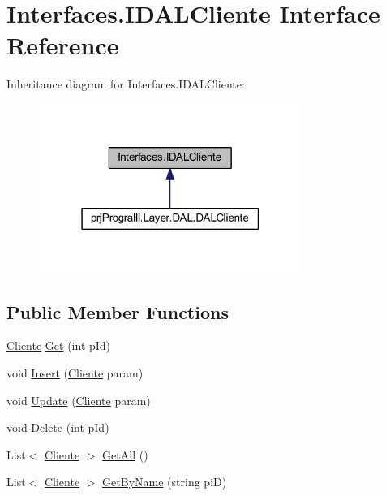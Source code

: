 \hypertarget{interface_interfaces_1_1_i_d_a_l_cliente}{}\section{Interfaces.\+I\+D\+A\+L\+Cliente Interface Reference}
\label{interface_interfaces_1_1_i_d_a_l_cliente}


Inheritance diagram for Interfaces.\+I\+D\+A\+L\+Cliente\+:
\nopagebreak
\begin{figure}[H]
\begin{center}
\leavevmode
\includegraphics[width=243pt]{interface_interfaces_1_1_i_d_a_l_cliente__inherit__graph}
\end{center}
\end{figure}
\subsection*{Public Member Functions}
\begin{DoxyCompactItemize}
\item 
\hyperlink{classprj_progra_i_i_i_1_1_layer_1_1_entities_1_1_cliente}{Cliente} \hyperlink{interface_interfaces_1_1_i_d_a_l_cliente_a73ffe691596e644e3b87f7685dc19e42}{Get} (int p\+Id)
\item 
void \hyperlink{interface_interfaces_1_1_i_d_a_l_cliente_a40bcf21f1dc9f878612b974300076d6c}{Insert} (\hyperlink{classprj_progra_i_i_i_1_1_layer_1_1_entities_1_1_cliente}{Cliente} param)
\item 
void \hyperlink{interface_interfaces_1_1_i_d_a_l_cliente_abe4143d07e9223b242e52e3b486f2c33}{Update} (\hyperlink{classprj_progra_i_i_i_1_1_layer_1_1_entities_1_1_cliente}{Cliente} param)
\item 
void \hyperlink{interface_interfaces_1_1_i_d_a_l_cliente_a1d5922d64bfd29e76bc6f26c60230c15}{Delete} (int p\+Id)
\item 
List$<$ \hyperlink{classprj_progra_i_i_i_1_1_layer_1_1_entities_1_1_cliente}{Cliente} $>$ \hyperlink{interface_interfaces_1_1_i_d_a_l_cliente_ac6adab4e78fae5e2bb08bff403d83fe7}{Get\+All} ()
\item 
List$<$ \hyperlink{classprj_progra_i_i_i_1_1_layer_1_1_entities_1_1_cliente}{Cliente} $>$ \hyperlink{interface_interfaces_1_1_i_d_a_l_cliente_a11ca3e48a2e757780fd59a2bd85e522f}{Get\+By\+Name} (string piD)
\end{DoxyCompactItemize}


